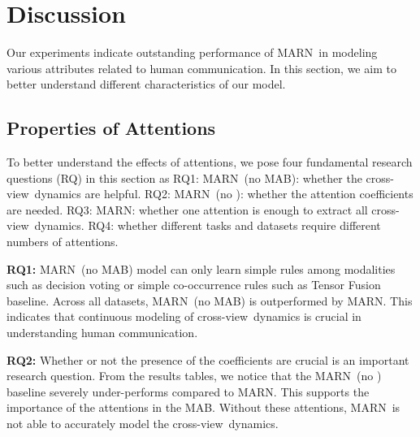 \documentclass[letterpaper]{article} \usepackage{aaai18}  \usepackage{times}  \usepackage{helvet}  \usepackage{courier}  \usepackage{url}  \usepackage{graphicx}  \usepackage{multirow}
\newcommand{\pipelines}{MARN}
\newcommand{\mabs}{MAB}
\newcommand{\intra}{view-specific}
\newcommand{\inter}{cross-view}
\newcommand{\commentAP}[1]{\textcolor{blue}{Amir to Paul: #1}}
\begin{document}
\section{Discussion}
Our experiments indicate outstanding performance of \pipelines \ in modeling various attributes related to human communication. In this section, we aim to better understand different characteristics of our model.

\iffalse
\subsection{Successful Long Sequence Modeling}
Our experiments indicate that as sequences get longer, the gap between \pipelines \ and previous state of the art increases.  We believe that as sequences get longer previous approaches performance is affected. However \pipelines \ is still able to model the dynamics in the sequence. We believe that this is because \pipelines \ explicitly models the \intra \ and \inter \ dynamics continuously through time. The shortest sequences belong to CMU-MOSI opinion segments (average 4 seconds video length) and our model shows  improvement while longest sequences belongs to ICT-MMMO (average 162 seconds video length) which our model shows  improvement (both for binary classification).
\commentAP{How long are the MMMO videos on average?} MMMO: 162, POM: 93.2, Youtube: 5.79, MOUD: 5.18, IEMOCAP: 4.44, CMU-MOSI: 4.23.
\fi

\subsection{Properties of Attentions}
To better understand the effects of attentions, we pose four fundamental research questions (RQ) in this section as RQ1: \pipelines \ (no MAB): whether the \inter \ dynamics are helpful. RQ2: \pipelines \ (no ): whether the attention coefficients are needed. RQ3: \pipelines: whether one attention is enough to extract all \inter \ dynamics. RQ4: whether different tasks and datasets require different numbers of attentions.

\textbf{RQ1:} \pipelines \ (no \mabs) model can only learn simple rules among modalities such as decision voting or simple co-occurrence rules such as Tensor Fusion baseline. Across all datasets, \pipelines \ (no MAB) is outperformed by \pipelines. This indicates that continuous modeling of \inter \ dynamics is crucial in understanding human communication. 

\textbf{RQ2:} Whether or not the presence of the coefficients  are crucial is an important research question. From the results tables, we notice that the \pipelines \ (no ) baseline severely under-performs compared to \pipelines. This supports the importance of the attentions in the \mabs. Without these attentions, \pipelines \ is not able to accurately model the \inter \ dynamics.
\end{document}
